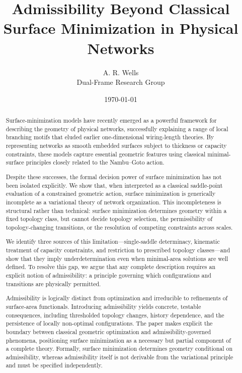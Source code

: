 \documentclass[11pt]{article}
\title{Admissibility Beyond Classical Surface Minimization in Physical Networks}
\author{A. R. Wells\\
\small Dual-Frame Research Group}
\date{\today}
\begin{document}
\maketitle

\begin{abstract}
Surface-minimization models have recently emerged as a powerful framework for describing the geometry of physical networks, successfully explaining a range of local branching motifs that eluded earlier one-dimensional wiring-length theories.\cite{Meng2026SurfaceOptimization} By representing networks as smooth embedded surfaces subject to thickness or capacity constraints, these models capture essential geometric features using classical minimal-surface principles closely related to the Nambu--Goto action.

Despite these successes, the formal decision power of surface minimization has not been isolated explicitly. We show that, when interpreted as a classical saddle-point evaluation of a constrained geometric action, surface minimization is generically incomplete as a variational theory of network organization. This incompleteness is structural rather than technical: surface minimization determines geometry within a fixed topology class, but cannot decide topology selection, the permissibility of topology-changing transitions, or the resolution of competing constraints across scales.

We identify three sources of this limitation---single-saddle determinacy, kinematic treatment of capacity constraints, and restriction to prescribed topology classes---and show that they imply underdetermination even when minimal-area solutions are well defined. To resolve this gap, we argue that any complete description requires an explicit notion of admissibility: a principle governing which configurations and transitions are physically permitted.

Admissibility is logically distinct from optimization and irreducible to refinements of surface-area functionals. Introducing admissibility yields concrete, testable consequences, including thresholded topology changes, history dependence, and the persistence of locally non-optimal configurations. The paper makes explicit the boundary between classical geometric optimization and admissibility-governed phenomena, positioning surface minimization as a necessary but partial component of a complete theory. Formally, surface minimization determines geometry conditional on admissibility, whereas admissibility itself is not derivable from the variational principle and must be specified independently.
\end{abstract}









\end{document}
